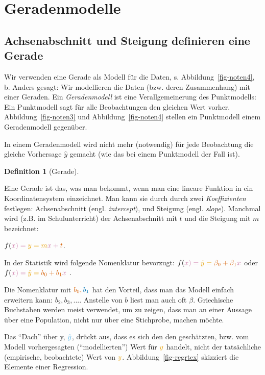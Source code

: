 \documentclass[
  letterpaper,
  twoside,
  open=any]{scrbook}
\theoremstyle{definition}
\theoremstyle{definition}
\theoremstyle{definition}
\newtheorem{definition}{Definition}[chapter]
\theoremstyle{remark}
\begin{document}
\section{Geradenmodelle}\label{geradenmodelle-1}

\subsection{Achsenabschnitt und Steigung definieren eine
Gerade}\label{achsenabschnitt-und-steigung-definieren-eine-gerade}

Wir verwenden eine Gerade als Modell für die Daten, s.
Abbildung~\ref{fig-noten4}, b. Anders gesagt: Wir modellieren die Daten
(bzw. deren Zusammenhang) mit einer Geraden. Ein \emph{Geradenmodell}
ist eine Verallgemeinerung des Punktmodells: Ein Punktmodell sagt für
alle Beobachtungen den gleichen Wert vorher. Abbildung~\ref{fig-noten3}
und Abbildung~\ref{fig-noten4} stellen ein Punktmodell einem
Geradenmodell gegenüber.

In einem Geradenmodell wird nicht mehr (notwendig) für jede Beobachtung
die gleiche Vorhersage \(\hat{y}\) gemacht (wie das bei einem
Punktmodell der Fall ist).

\begin{definition}[Gerade]\protect\hypertarget{def-gerade}{}\label{def-gerade}

Eine Gerade ist das, was man bekommt, wenn man eine lineare Funktion in
ein Koordinatensystem einzeichnet. Man kann sie durch durch zwei
\emph{Koeffizienten} festlegen: Achsenabschnitt (engl.
\emph{intercept}), und Steigung (engl. \emph{slope}). Manchmal wird
(z.B. im Schulunterricht) der Achsenabschnitt mit \(t\) und die Steigung
mit \(m\) bezeichnet:

\(f(\color{xcol}{x})=\color{ycol}{y}={m} \color{xcol}{x} + \color{beta0col}{t}\).

In der Statistik wird folgende Nomenklatur bevorzugt:
\(f(\color{xcol}{x})=\color{ycol}{\hat{y}}=\color{beta0col}{\beta_0} + {\beta_1} \color{xcol}{x}\)
oder
\(f(\color{xcol}{x})=\color{ycol}{\hat{y}}= \color{beta0col}{b_0} + {b_1} \color{xcol}{x}\)
.

Die Nomenklatur mit \(\color{beta0col}{b_0}, \color{beta1col}{b_1}\) hat
den Vorteil, dass man das Modell einfach erweitern kann:
\(b_2, b_3, ...\). Anstelle von \(b\) liest man auch oft \(\beta\).
Griechische Buchstaben werden meist verwendet, um zu zeigen, dass man an
einer Aussage über eine Population, nicht nur über eine Stichprobe,
machen möchte.

Das \enquote{Dach} über y, \(\color{modelcol}{\hat{y}}\), drückt aus,
dass es sich den den geschätzten, bzw. vom Modell vorhergesagten
(\enquote{modellierten}) Wert für \(\color{ycol}{y}\) handelt, nicht der
tatsächliche (empirische, beobachtete) Wert von \(\color{ycol}{y}\).
Abbildung~\ref{fig-regrtex} skizziert die Elemente einer Regression.

\end{definition}
\end{document}

